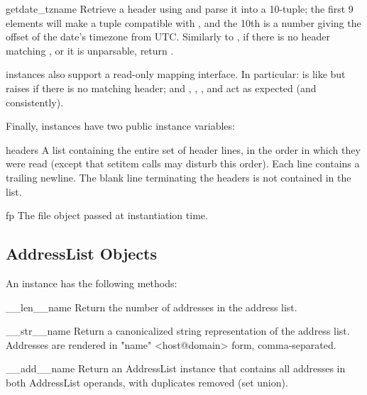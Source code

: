 \begin{methoddesc}{getdate_tz}{name}
Retrieve a header using  and parse it into a
10-tuple; the first 9 elements will make a tuple compatible with
, and the 10th is a number giving the offset
of the date's timezone from UTC.  Similarly to , if
there is no header matching , or it is unparsable, return
. 
\end{methoddesc}

 instances also support a read-only mapping interface.
In particular:  is like
 but raises  if
there is no matching header; and ,
, ,
 and  act as expected
(and consistently).

Finally,  instances have two public instance variables:

\begin{memberdesc}{headers}
A list containing the entire set of header lines, in the order in
which they were read (except that setitem calls may disturb this
order). Each line contains a trailing newline.  The
blank line terminating the headers is not contained in the list.
\end{memberdesc}

\begin{memberdesc}{fp}
The file object passed at instantiation time.
\end{memberdesc}

\subsection{AddressList Objects}
\label{addresslist-objects}

An  instance has the following methods:

\begin{methoddesc}{__len__}{name}
Return the number of addresses in the address list.
\end{methoddesc}

\begin{methoddesc}{__str__}{name}
Return a canonicalized string representation of the address list.
Addresses are rendered in "name" <host@domain> form, comma-separated.
\end{methoddesc}

\begin{methoddesc}{__add__}{name}
Return an AddressList instance that contains all addresses in both
AddressList operands, with duplicates removed (set union).
\end{methoddesc}

